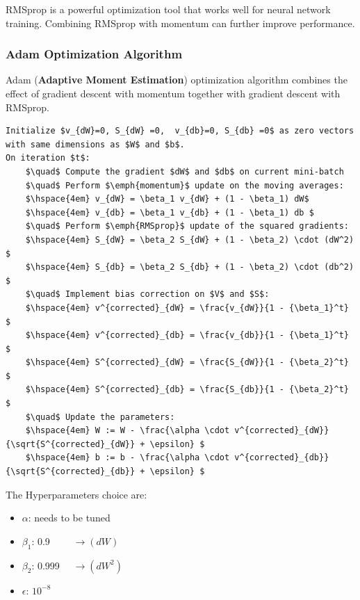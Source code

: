 \documentclass[letterpaper,12pt,notitlepage,twoside]{report}
\begin{document}
RMSprop is a powerful optimization tool that works well for neural network training. Combining RMSprop with momentum can further improve performance.

\subsubsection{Adam Optimization Algorithm}
Adam (\textbf{Adaptive Moment Estimation}) optimization algorithm combines the effect of gradient descent with momentum together with gradient descent with RMSprop.

\begin{lstlisting}
Initialize $v_{dW}=0, S_{dW} =0,  v_{db}=0, S_{db} =0$ as zero vectors with same dimensions as $W$ and $b$.
On iteration $t$: 
	$\quad$ Compute the gradient $dW$ and $db$ on current mini-batch
	$\quad$ Perform $\emph{momentum}$ update on the moving averages:
	$\hspace{4em} v_{dW} = \beta_1 v_{dW} + (1 - \beta_1) dW$
	$\hspace{4em} v_{db} = \beta_1 v_{db} + (1 - \beta_1) db $
	$\quad$ Perform $\emph{RMSprop}$ update of the squared gradients:
	$\hspace{4em} S_{dW} = \beta_2 S_{dW} + (1 - \beta_2) \cdot (dW^2) $
	$\hspace{4em} S_{db} = \beta_2 S_{db} + (1 - \beta_2) \cdot (db^2) $
	$\quad$ Implement bias correction on $V$ and $S$:
	$\hspace{4em} v^{corrected}_{dW} = \frac{v_{dW}}{1 - {\beta_1}^t} $
	$\hspace{4em} v^{corrected}_{db} = \frac{v_{db}}{1 - {\beta_1}^t} $
	$\hspace{4em} S^{corrected}_{dW} = \frac{S_{dW}}{1 - {\beta_2}^t} $
	$\hspace{4em} S^{corrected}_{db} = \frac{S_{db}}{1 - {\beta_2}^t} $
	$\quad$ Update the parameters:
	$\hspace{4em} W := W - \frac{\alpha \cdot v^{corrected}_{dW}}{\sqrt{S^{corrected}_{dW}} + \epsilon} $
	$\hspace{4em} b := b - \frac{\alpha \cdot v^{corrected}_{db}}{\sqrt{S^{corrected}_{db}} + \epsilon} $	
\end{lstlisting}

The Hyperparameters choice are:
\begin{itemize}[label={}]
	\item \(\alpha\): needs to be tuned
	\item \(\beta_1\): 0.9 \(\qquad \longrightarrow (dW)\)
	\item \(\beta_2\): 0.999 \(\quad \longrightarrow (dW^2)\)
	\item \(\epsilon\): \(10^{-8}\)
\end{itemize}
\end{document}
